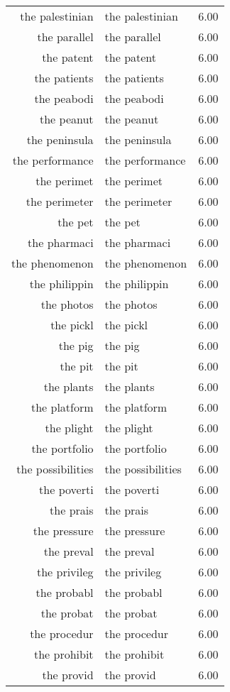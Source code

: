 \begin{table}[ht]
\begin{tabular}{rlr}
  the palestinian & the palestinian & 6.00 \\ 
  the parallel & the parallel & 6.00 \\ 
  the patent & the patent & 6.00 \\ 
  the patients & the patients & 6.00 \\ 
  the peabodi & the peabodi & 6.00 \\ 
  the peanut & the peanut & 6.00 \\ 
  the peninsula & the peninsula & 6.00 \\ 
  the performance & the performance & 6.00 \\ 
  the perimet & the perimet & 6.00 \\ 
  the perimeter & the perimeter & 6.00 \\ 
  the pet & the pet & 6.00 \\ 
  the pharmaci & the pharmaci & 6.00 \\ 
  the phenomenon & the phenomenon & 6.00 \\ 
  the philippin & the philippin & 6.00 \\ 
  the photos & the photos & 6.00 \\ 
  the pickl & the pickl & 6.00 \\ 
  the pig & the pig & 6.00 \\ 
  the pit & the pit & 6.00 \\ 
  the plants & the plants & 6.00 \\ 
  the platform & the platform & 6.00 \\ 
  the plight & the plight & 6.00 \\ 
  the portfolio & the portfolio & 6.00 \\ 
  the possibilities & the possibilities & 6.00 \\ 
  the poverti & the poverti & 6.00 \\ 
  the prais & the prais & 6.00 \\ 
  the pressure & the pressure & 6.00 \\ 
  the preval & the preval & 6.00 \\ 
  the privileg & the privileg & 6.00 \\ 
  the probabl & the probabl & 6.00 \\ 
  the probat & the probat & 6.00 \\ 
  the procedur & the procedur & 6.00 \\ 
  the prohibit & the prohibit & 6.00 \\ 
  the provid & the provid & 6.00 \\ 

\end{tabular}
\end{table}
